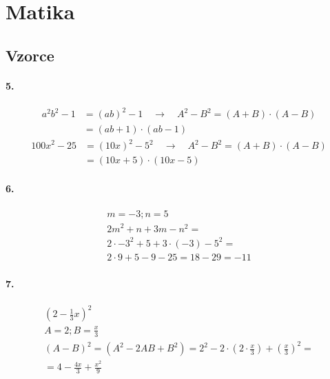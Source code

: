 \documentclass[12pt]{article}
\begin{document}
\section{Matika}
\subsection{Vzorce}
\paragraph{5.}
\begin{equation}
\begin{split}
\nonumber
{ a }^{ 2 }{ b }^{ 2 }-1&={ (ab) }^{ 2 }-1\quad \rightarrow \quad { A }^{ 2 }-{ B }^{ 2 }=(A+B)\cdot (A-B)\\
&=(ab+1)\cdot (ab-1)
\end{split}
\end{equation}
\begin{equation}
\begin{split}
\nonumber
{ 100x }^{ 2 }-25 &={ (10x) }^{ 2 }-{ 5 }^{ 2 }\quad \rightarrow \quad { A }^{ 2 }-{ B }^{ 2 }=(A+B)\cdot (A-B)\\
&=(10x+5)\cdot (10x-5)
\end{split}
\end{equation}
\paragraph{6.}
\begin{equation}
\begin{split}
\nonumber
m=-3; n=5\\
{2m}^{2}+n+3m-{n}^{2}=\\
2\cdot {-3}^{2} + 5 + 3\cdot (-3) - {5}^{2}=\\
2\cdot 9+5-9-25=18-29=-11
\end{split}
\end{equation}

\paragraph{7.}
\begin{equation}
\begin{split}
\nonumber
{ \left( 2-\frac { 1 }{ 3 } x \right)  }^{ 2 }\\
A=2 ; B=\frac{x}{3}\\
{ (A-B) }^{ 2 }=({ A }^{ 2 }-2AB+{ B }^{ 2 })=
{ 2 }^{ 2 }-2\cdot \left( 2\cdot \frac { x }{ 3 }  \right) +{ \left( \frac { x }{ 3 }  \right)  }^{ 2 }=\\
=4-\frac{4x}{3}+\frac{{x}^{2}}{9}
\end{split}
\end{equation}
\end{document}
